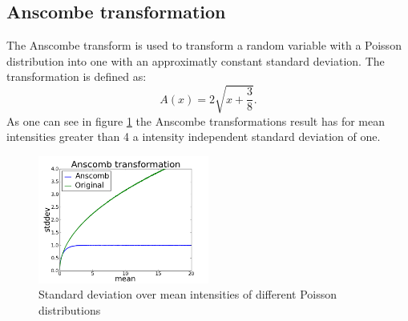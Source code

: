 \subsection{Anscombe transformation}
\label{trafoAnscombe}
The Anscombe transform \cite{anscombe} is used to transform a random variable with a Poisson
distribution into one with an approximatly constant standard deviation. The
transformation is defined as:
\begin{equation}
	A(x) = 2\sqrt{x+\frac{3}{8}}.
\end{equation}
As one can see in figure \ref{anscombe} the Anscombe transformations result has
for mean intensities greater than 4 a intensity independent standard deviation of
one.
\begin{figure}
	\centering
	\includegraphics[width = 0.5\textwidth]{pictures/anscombe.png}
	\caption{Standard deviation over mean intensities of different Poisson
	distributions}
	\label{anscombe}
	
\end{figure}

